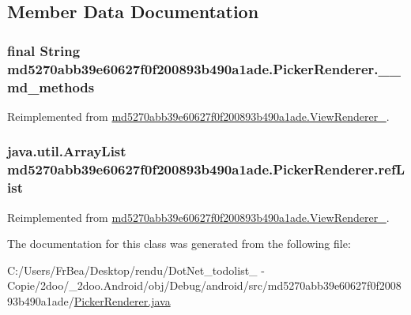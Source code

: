 \subsection{Member Data Documentation}
\hypertarget{classmd5270abb39e60627f0f200893b490a1ade_1_1_picker_renderer_74038f85b1fb16f11210e480152a004c}{
\subsubsection[{\_\-\_\-md\_\-methods}]{\setlength{\rightskip}{0pt plus 5cm}final String {\bf md5270abb39e60627f0f200893b490a1ade.PickerRenderer.\_\-\_\-md\_\-methods}}}
\label{classmd5270abb39e60627f0f200893b490a1ade_1_1_picker_renderer_74038f85b1fb16f11210e480152a004c}




Reimplemented from \hyperlink{classmd5270abb39e60627f0f200893b490a1ade_1_1_view_renderer__2_c66b6f41d2afba0df6ae890c8f2b644b}{md5270abb39e60627f0f200893b490a1ade.ViewRenderer\_}.\hypertarget{classmd5270abb39e60627f0f200893b490a1ade_1_1_picker_renderer_63b7af8001f6b5d63bc7d868b9d12d4c}{
\subsubsection[{refList}]{\setlength{\rightskip}{0pt plus 5cm}java.util.ArrayList {\bf md5270abb39e60627f0f200893b490a1ade.PickerRenderer.refList}}}
\label{classmd5270abb39e60627f0f200893b490a1ade_1_1_picker_renderer_63b7af8001f6b5d63bc7d868b9d12d4c}




Reimplemented from \hyperlink{classmd5270abb39e60627f0f200893b490a1ade_1_1_view_renderer__2_489e61f24650a22849fddacb3f498a6b}{md5270abb39e60627f0f200893b490a1ade.ViewRenderer\_}.

The documentation for this class was generated from the following file:\begin{CompactItemize}
\item 
C:/Users/FrBea/Desktop/rendu/DotNet\_\-todolist\_ - Copie/2doo/\_\-2doo.Android/obj/Debug/android/src/md5270abb39e60627f0f200893b490a1ade/\hyperlink{md5270abb39e60627f0f200893b490a1ade_2_picker_renderer_8java}{PickerRenderer.java}\end{CompactItemize}
